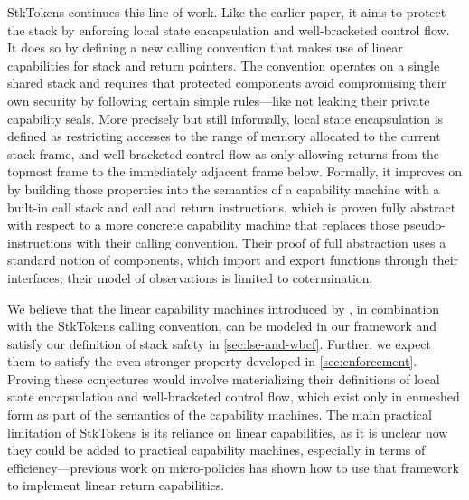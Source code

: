 \documentclass[acmsmall,review,anonymous]{acmart}\settopmatter{printfolios=true,printccs=false,printacmref=false}
\begin{document}
{StkTokens \citep{Skorstengaard+19} continues this line of work. Like
the earlier paper, it aims to protect the stack by enforcing local state
encapsulation and well-bracketed control flow. It does so by defining a new
calling convention that makes use of linear capabilities for stack and return
pointers. The convention operates on a single shared stack and requires that
protected components avoid compromising their own security by following certain
simple rules---like not leaking their private capability seals. More
precisely but still informally, local state encapsulation is defined as
restricting accesses to the range of memory allocated to the current stack
frame, and well-bracketed control flow as only allowing returns from the topmost
frame to the immediately adjacent frame below. Formally, it improves on
\citet{Skorstengaard+19b} by building those properties into the semantics of a
capability machine with a built-in call stack and call and return instructions,
which is proven fully abstract with respect to a more concrete capability
machine that replaces those pseudo-instructions with their calling convention.
Their proof of full abstraction uses a standard notion of components, which
import and export functions through their interfaces; their model of
observations is limited to cotermination.

We believe that the linear capability machines introduced by
\citep{Skorstengaard+19}, in combination with the StkTokens calling convention,
can be modeled in our framework and satisfy our definition of stack safety in
\cref{sec:lse-and-wbcf}. Further, we expect them to satisfy the even stronger
property developed in \cref{sec:enforcement}. Proving these conjectures would
involve materializing their definitions of local state encapsulation and
well-bracketed control flow, which exist only in enmeshed form as part of the
semantics of the capability machines. The main practical limitation of StkTokens
is its reliance on linear capabilities, as it is unclear now they could be added
to practical capability machines, especially in terms of efficiency---previous
work on micro-policies \citep{yannis-report} has shown how to use that framework
to implement linear return capabilities.

}
\end{document}

